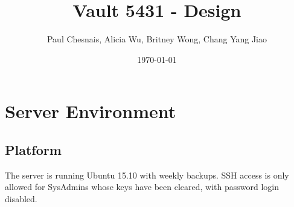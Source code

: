 \documentclass{article}
\title{Vault 5431 - Design}
\author{Paul Chesnais, Alicia Wu, Britney Wong, Chang Yang Jiao}
\date{\today}
\begin{document}
\maketitle
\thispagestyle{empty}

\section{Server Environment}
\label{sec:server_environment}

\subsection{Platform}
\label{sub:platform}
\par The server is running Ubuntu 15.10 with weekly backups. SSH access is only allowed for SysAdmins whose keys have been cleared, with password login disabled.
\end{document}
